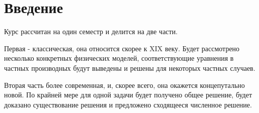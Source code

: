 
\chapter*{Введение}
Курс рассчитан на один семестр и делится на две части.

Первая - классическая, она относится скорее к XIX веку. Будет рассмотрено несколько конкретных физических моделей, соответствующие уравнения в частных производных будут выведены и решены для некоторых частных случаев.

Вторая часть более современная, и, скорее всего, она окажется концепутально новой. По крайней мере для одной задачи будет получено общее решение, будет доказано существование решения и предложено сходящееся численное решение.

\pagebreak

